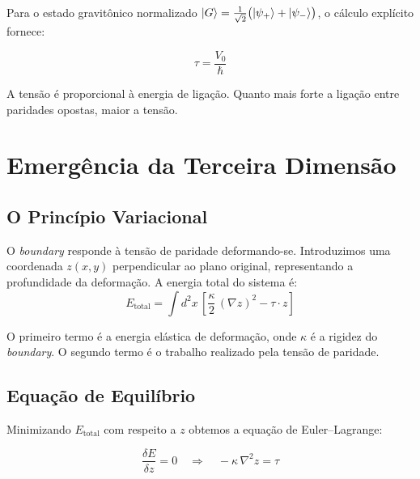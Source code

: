 \documentclass[12pt,a4paper,twoside]{article}
\newcommand{\psion}{\psi}
\newcommand{\boundary}{\textit{boundary}}
\begin{document}
\noindent Para o estado gravit\^onico normalizado $\ket{G} = \frac{1}{\sqrt{2}}\bigl(\ket{\psion_+} + \ket{\psion_-}\bigr)$, o c\'alculo expl\'icito fornece:
\begin{equationbox}[title={Tens\~ao de Paridade}]
\begin{equation}
\boxed{\tau = \frac{V_0}{\hbar}}
\label{eq:tensao_resultado}
\end{equation}
\end{equationbox}

\noindent A tens\~ao \'e proporcional \`a energia de liga\c{c}\~ao. Quanto mais forte a liga\c{c}\~ao entre paridades opostas, maior a tens\~ao.


\section{Emerg\^encia da Terceira Dimens\~ao}


\subsection{O Princ\'ipio Variacional}

O \boundary{} responde \`a tens\~ao de paridade deformando-se. Introduzimos uma coordenada $z(x,y)$ perpendicular ao plano original, representando a profundidade da deforma\c{c}\~ao. A energia total do sistema \'e:
\begin{equation}
E_{\text{total}} = \int d^2x\,\left[\frac{\kappa}{2}\,(\nabla z)^2 - \tau\cdot z\right]
\label{eq:energia_total}
\end{equation}

O primeiro termo \'e a energia el\'astica de deforma\c{c}\~ao, onde $\kappa$ \'e a rigidez do \boundary. O segundo termo \'e o trabalho realizado pela tens\~ao de paridade.

\subsection{Equa\c{c}\~ao de Equil\'ibrio}

Minimizando $E_{\text{total}}$ com respeito a $z$ obtemos a equa\c{c}\~ao de Euler--Lagrange:
\begin{equationbox}[title={Equa\c{c}\~ao de Poisson para a Profundidade}]
\begin{equation}
\frac{\delta E}{\delta z} = 0 \quad\Longrightarrow\quad -\kappa\,\nabla^2 z = \tau
\label{eq:poisson_profundidade}
\end{equation}
\end{equationbox}
\end{document}
